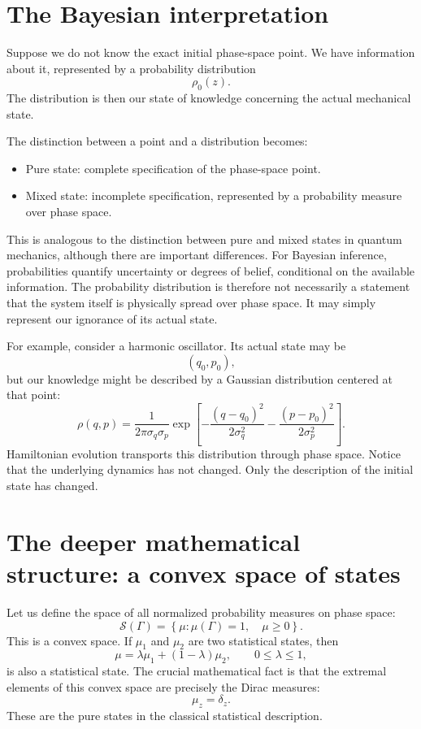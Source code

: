 \section{ The Bayesian interpretation}
Suppose we do not know the exact initial phase-space point. We have information
about it, represented by a probability distribution
\[\rho_0(z).\]
The distribution is then our state of knowledge concerning the actual
mechanical state.

The distinction between a point and a distribution becomes:
\begin{itemize}
\item Pure state: complete specification of the phase-space point.
\item Mixed state: incomplete specification, represented by a probability
    measure over phase space.
\end{itemize}
This is analogous to the distinction between pure and mixed states in quantum
mechanics, although there are important differences.
For Bayesian inference, probabilities quantify uncertainty or degrees of
belief, conditional on the available information.
The probability distribution is therefore not necessarily a statement that the
system itself is physically spread over phase space. It may simply represent
our ignorance of its actual state.

For example, consider a harmonic oscillator.
Its actual state may be
\[(q_0,p_0),\]
but our knowledge might be described by a Gaussian distribution centered at that point:
\[
\rho(q,p)=
\frac{1}{2\pi\sigma_q\sigma_p}
\exp\left[
-\frac{(q-q_0)^2}{2\sigma_q^2}
-\frac{(p-p_0)^2}{2\sigma_p^2}
\right].
\]
Hamiltonian evolution transports this distribution through phase space.
Notice that the underlying dynamics has not changed. Only the description of
the initial state has changed.

\section{The deeper mathematical structure: a convex space of states}
Let us define the space of all normalized probability measures on phase space:
\[\mathcal S(\Gamma)=\left\{\mu:\mu(\Gamma)=1,\quad \mu\geq 0\right\}.\]
This is a convex space.
If \(\mu_1\) and \(\mu_2\) are two statistical states, then
\[\mu=\lambda\mu_1+(1-\lambda)\mu_2,\qquad 0\leq\lambda\leq1,\]
is also a statistical state.
The crucial mathematical fact is that the extremal elements of this convex
space are precisely the Dirac measures:
\[\mu_z=\delta_z.\]
These are the pure states in the classical statistical description.

